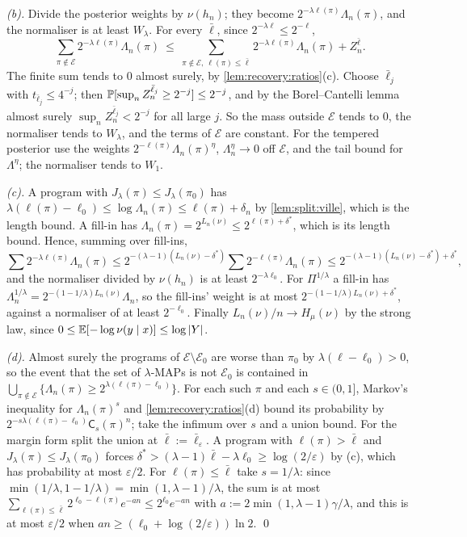 \emph{(b).} Divide the posterior weights by $\nu(h_n)$; they become $2^{-\lambda\ell(\pi)}\Lambda_n(\pi)$, and the normaliser is at least $W_\lambda$. For every $\bar\ell$, since $2^{-\lambda\ell}\le2^{-\ell}$,
\[
\sum_{\pi\notin\mathcal E}2^{-\lambda\ell(\pi)}\Lambda_n(\pi)\ \le\ \sum_{\pi\notin\mathcal E,\ \ell(\pi)\le\bar\ell}2^{-\lambda\ell(\pi)}\Lambda_n(\pi)+Z^{\bar\ell}_n .
\]
The finite sum tends to $0$ almost surely, by \cref{lem:recovery:ratios}(c). Choose $\bar\ell_j$ with $t_{\bar\ell_j}\le4^{-j}$; then $\mathbb{P}[\sup_nZ^{\bar\ell_j}_n\ge2^{-j}]\le2^{-j}$, and by the Borel--Cantelli lemma almost surely $\sup_nZ^{\bar\ell_j}_n<2^{-j}$ for all large $j$. So the mass outside $\mathcal E$ tends to $0$, the normaliser tends to $W_\lambda$, and the terms of $\mathcal E$ are constant. For the tempered posterior use the weights $2^{-\ell(\pi)}\Lambda_n(\pi)^\eta$, $\Lambda_n^\eta\to0$ off $\mathcal E$, and the tail bound for $\Lambda^\eta$; the normaliser tends to $W_1$.

\emph{(c).} A program with $J_\lambda(\pi)\le J_\lambda(\pi_0)$ has $\lambda(\ell(\pi)-\ell_0)\le\log\Lambda_n(\pi)\le\ell(\pi)+\delta_n$ by \cref{lem:split:ville}, which is the length bound. A fill-in has $\Lambda_n(\pi)=2^{L_n(\nu)}\le2^{\ell(\pi)+\delta^*}$, which is its length bound. Hence, summing over fill-ins,
\[
\sum2^{-\lambda\ell(\pi)}\Lambda_n(\pi)\le2^{-(\lambda-1)(L_n(\nu)-\delta^*)}\sum2^{-\ell(\pi)}\Lambda_n(\pi)\le2^{-(\lambda-1)(L_n(\nu)-\delta^*)+\delta^*},
\]
and the normaliser divided by $\nu(h_n)$ is at least $2^{-\lambda\ell_0}$. For $\Pi^{1/\lambda}$ a fill-in has $\Lambda_n^{1/\lambda}=2^{-(1-1/\lambda)L_n(\nu)}\Lambda_n$, so the fill-ins' weight is at most $2^{-(1-1/\lambda)L_n(\nu)+\delta^*}$, against a normaliser of at least $2^{-\ell_0}$. Finally $L_n(\nu)/n\to H_\mu(\nu)$ by the strong law, since $0\le\mathbb{E}[-\log\nu(y\mid x)]\le\log|Y|$.

\emph{(d).} Almost surely the programs of $\mathcal E\setminus\mathcal E_0$ are worse than $\pi_0$ by $\lambda(\ell-\ell_0)>0$, so the event that the set of $\lambda$-MAPs is not $\mathcal E_0$ is contained in $\bigcup_{\pi\notin\mathcal E}\{\Lambda_n(\pi)\ge2^{\lambda(\ell(\pi)-\ell_0)}\}$. For each such $\pi$ and each $s\in(0,1]$, Markov's inequality for $\Lambda_n(\pi)^s$ and \cref{lem:recovery:ratios}(d) bound its probability by $2^{-s\lambda(\ell(\pi)-\ell_0)}\mathsf C_s(\pi)^n$; take the infimum over $s$ and a union bound. For the margin form split the union at $\bar\ell:=\bar\ell_\varepsilon$. A program with $\ell(\pi)>\bar\ell$ and $J_\lambda(\pi)\le J_\lambda(\pi_0)$ forces $\delta^*>(\lambda-1)\bar\ell-\lambda\ell_0\ge\log(2/\varepsilon)$ by (c), which has probability at most $\varepsilon/2$. For $\ell(\pi)\le\bar\ell$ take $s=1/\lambda$: since $\min(1/\lambda,1-1/\lambda)=\min(1,\lambda-1)/\lambda$, the sum is at most $\sum_{\ell(\pi)\le\bar\ell}2^{\ell_0-\ell(\pi)}e^{-an}\le2^{\ell_0}e^{-an}$ with $a:=2\min(1,\lambda-1)\gamma/\lambda$, and this is at most $\varepsilon/2$ when $an\ge(\ell_0+\log(2/\varepsilon))\ln2$. \qed

